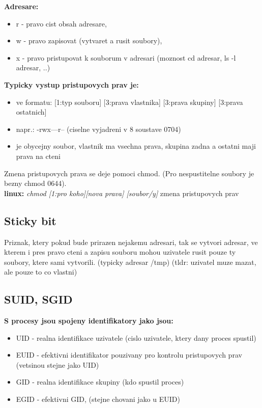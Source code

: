 \documentclass[a4paper, 11pt]{article}
\begin{document}
\textbf{Adresare:}
\begin{itemize}
    \item r - pravo cist obsah adresare,
    \item w - pravo zapisovat (vytvaret a rusit soubory),
    \item x - pravo pristupovat k souborum v adresari (moznost cd adresar, ls -l adresar, ..) \\
\end{itemize}

\textbf{Typicky vystup pristupovych prav je:}
\begin{itemize}
    \item ve formatu: [1:typ souboru] [3:prava vlastnika] [3:prava skupiny] [3:prava ostatnich]
    \item napr.: -rwx---r-- (ciselne vyjadreni v 8 soustave 0704)
    \item je obycejny soubor, vlastnik ma vsechna prava, skupina zadna a ostatni maji prava na cteni \\
\end{itemize}

Zmena pristupovych prava se deje pomoci chmod. (Pro nespustitelne soubory je bezny chmod 0644). \\

\textbf{linux:}
\textit{chmod [1:pro koho][nova prava] [soubor/y]} zmena pristupovych prav \\

\subsection{Sticky bit}
Priznak, ktery pokud bude prirazen nejakemu adresari, tak se vytvori adresar, ve kterem i pres pravo cteni a zapisu souboru mohou uzivatele rusit pouze ty soubory, ktere sami vytvorili. (typicky adresar /tmp) (tldr: uzivatel muze mazat, ale pouze to co vlastni) \\

\subsection{SUID, SGID}
\textbf{S procesy jsou spojeny identifikatory jako jsou:}
\begin{itemize}
    \item UID - realna identifikace uzivatele (cislo uzivatele, ktery dany proces spustil)
    \item EUID - efektivni identifikator pouzivany pro kontrolu pristupovych prav (vetsinou stejne jako UID)
    \item GID - realna identifikace skupiny (kdo spustil proces)
    \item EGID - efektivni GID, (stejne chovani jako u EUID) \\
\end{itemize}
\end{document}
